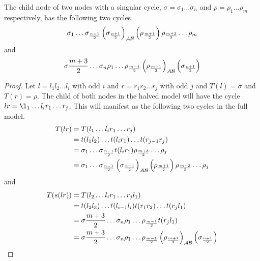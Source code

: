 \begin{theorem}
	The child node of two nodes with a singular cycle, $\sigma = \sigma_1 \dots \sigma_n$ and $\rho = \rho_1 \dots \rho_m$ respectively, has the following two cycles.
	\begin{align*}
		\sigma_1 \dots \sigma_{\frac{n-1}{2}} \left(\sigma_{\frac{n+1}{2}}\right)_{\mathcal{A}\mathcal{B}}
		\left(\rho_{\frac{m+1}{2}}\right) \rho_{\frac{m+3}{2}} \dots \rho_m
	\end{align*}
	and
	\begin{align*}
		\sigma{\frac{m+3}{2}} \dots \sigma_n \rho_1 \dots \rho_{\frac{m-1}{2}}
		\left(\rho_{\frac{m+1}{2}}\right)_{\mathcal{A}\mathcal{B}} \left(\sigma_{\frac{n+1}{2}}\right)
	\end{align*}
\end{theorem}

\begin{proof}
	Let $l = l_1l_2 \dots l_i$ with odd $i$ and $r = r_1r_2 \dots r_j$ with odd $j$ and $T(l) = \sigma$ and $T(r) = \rho$.
	The child of both nodes in the halved model will have the cycle $lr = \l_1 \dots l_i r_1 \dots r_j$.
	This will manifest as the following two cycles in the full model.
	\begin{align*}
		T(lr) & = T(l_1 \dots l_i r_1 \dots r_j)                                                    \\
		      & = t(l_1l_2) \dots t(l_ir_1) \dots t(r_{j-1}r_j)                                     \\
		      & = \sigma_1 \dots \sigma_{\frac{n-1}{2}} t(l_ir_1) \rho_{\frac{m+3}{2}} \dots \rho_j \\
		      & = \sigma_1 \dots \sigma_{\frac{n-1}{2}} \left(\sigma_{\frac{n+1}{2}}\right)_{\mathcal{A}\mathcal{B}}
		\left(\rho_{\frac{m+1}{2}}\right) \rho_{\frac{m+3}{2}} \dots \rho_j
	\end{align*}
	and
	\begin{align*}
		T(s(lr)) & = T(l_2 \dots l_i r_1 \dots r_j l_1)                                               \\
		         & = t(l_2l_3) \dots t(l_{i-1}l_i) t(r_1r_2) \dots t(r_jl_1)                          \\
		         & = \sigma{\frac{m+3}{2}} \dots \sigma_n \rho_1 \dots \rho_{\frac{m-1}{2}} t(r_jl_1) \\
		         & = \sigma{\frac{m+3}{2}} \dots \sigma_n \rho_1 \dots \rho_{\frac{m-1}{2}}
		\left(\rho_{\frac{m+1}{2}}\right)_{\mathcal{A}\mathcal{B}} \left(\sigma_{\frac{n+1}{2}}\right)
	\end{align*}
\end{proof}

